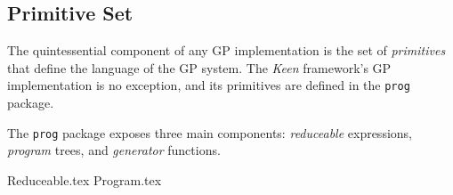 
\subsection{Primitive Set}
\label{sec:keen:gp:primitives}
  The quintessential component of any GP implementation is the set of
  \textit{primitives} that define the language of the GP system. The
  \textit{Keen} framework's GP implementation is no exception, and its
  primitives are defined in the \texttt{prog} package.

  The \texttt{prog} package exposes three main components: \emph{reduceable}
  expressions, \emph{program} trees, and \emph{generator} functions.

  {Reduceable.tex}
  {Program.tex}
  
